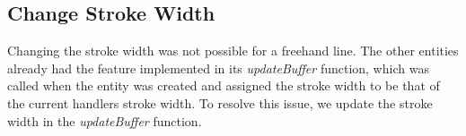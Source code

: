 \subsection{Change Stroke Width}
Changing the stroke width was not possible for a freehand line.
The other entities already had the feature implemented in its \textit{updateBuffer} function, which was called when the entity was created and assigned the stroke width to be that of the current handlers stroke width.
To resolve this issue, we update the stroke width in the \textit{updateBuffer} function.